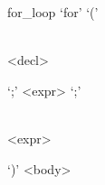 \documentclass[convert={outext=.png}]{standalone}
\begin{document}
\begin{málrit}{for_loop}
	`for' `('
	 \begin{stack}
	 \\
	 	<decl>
	 \end{stack}
	 `;' <expr> `;'
	 \begin{stack}
	 \\
	 	<expr>
	 \end{stack}
	 `)' <body>
\end{málrit}
\end{document}

